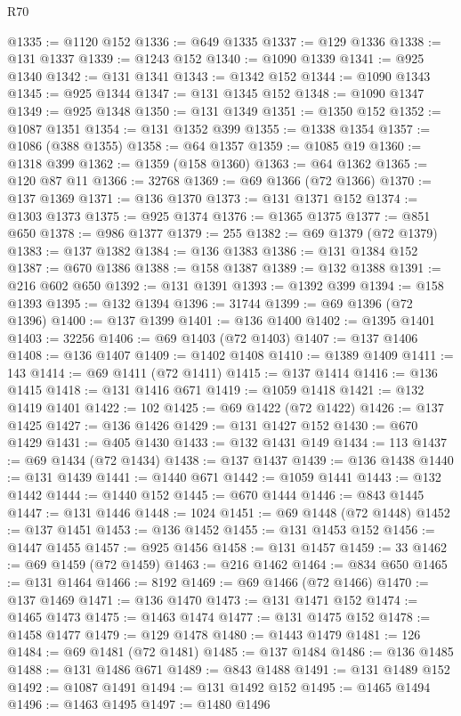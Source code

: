 \begin{lexlean}{R70}
\begin{coremodule}
@1335 := @1120 @152
@1336 := @649 @1335
@1337 := @129 @1336
@1338 := @131 @1337
@1339 := @1243 @152
@1340 := @1090 @1339
@1341 := @925 @1340
@1342 := @131 @1341
@1343 := @1342 @152
@1344 := @1090 @1343
@1345 := @925 @1344
@1347 := @131 @1345 @152
@1348 := @1090 @1347
@1349 := @925 @1348
@1350 := @131 @1349
@1351 := @1350 @152
@1352 := @1087 @1351
@1354 := @131 @1352 @399
@1355 := @1338 @1354
@1357 := @1086 (@388 @1355)
@1358 := @64 @1357
@1359 := @1085 @19
@1360 := @1318 @399
@1362 := @1359 (@158 @1360)
@1363 := @64 @1362
@1365 := @120 @87 @11
@1366 := 32768
@1369 := @69 @1366 (@72 @1366)
@1370 := @137 @1369
@1371 := @136 @1370
@1373 := @131 @1371 @152
@1374 := @1303 @1373
@1375 := @925 @1374
@1376 := @1365 @1375
@1377 := @851 @650
@1378 := @986 @1377
@1379 := 255
@1382 := @69 @1379 (@72 @1379)
@1383 := @137 @1382
@1384 := @136 @1383
@1386 := @131 @1384 @152
@1387 := @670 @1386
@1388 := @158 @1387
@1389 := @132 @1388
@1391 := @216 @602 @650
@1392 := @131 @1391
@1393 := @1392 @399
@1394 := @158 @1393
@1395 := @132 @1394
@1396 := 31744
@1399 := @69 @1396 (@72 @1396)
@1400 := @137 @1399
@1401 := @136 @1400
@1402 := @1395 @1401
@1403 := 32256
@1406 := @69 @1403 (@72 @1403)
@1407 := @137 @1406
@1408 := @136 @1407
@1409 := @1402 @1408
@1410 := @1389 @1409
@1411 := 143
@1414 := @69 @1411 (@72 @1411)
@1415 := @137 @1414
@1416 := @136 @1415
@1418 := @131 @1416 @671
@1419 := @1059 @1418
@1421 := @132 @1419 @1401
@1422 := 102
@1425 := @69 @1422 (@72 @1422)
@1426 := @137 @1425
@1427 := @136 @1426
@1429 := @131 @1427 @152
@1430 := @670 @1429
@1431 := @405 @1430
@1433 := @132 @1431 @149
@1434 := 113
@1437 := @69 @1434 (@72 @1434)
@1438 := @137 @1437
@1439 := @136 @1438
@1440 := @131 @1439
@1441 := @1440 @671
@1442 := @1059 @1441
@1443 := @132 @1442
@1444 := @1440 @152
@1445 := @670 @1444
@1446 := @843 @1445
@1447 := @131 @1446
@1448 := 1024
@1451 := @69 @1448 (@72 @1448)
@1452 := @137 @1451
@1453 := @136 @1452
@1455 := @131 @1453 @152
@1456 := @1447 @1455
@1457 := @925 @1456
@1458 := @131 @1457
@1459 := 33
@1462 := @69 @1459 (@72 @1459)
@1463 := @216 @1462
@1464 := @834 @650
@1465 := @131 @1464
@1466 := 8192
@1469 := @69 @1466 (@72 @1466)
@1470 := @137 @1469
@1471 := @136 @1470
@1473 := @131 @1471 @152
@1474 := @1465 @1473
@1475 := @1463 @1474
@1477 := @131 @1475 @152
@1478 := @1458 @1477
@1479 := @129 @1478
@1480 := @1443 @1479
@1481 := 126
@1484 := @69 @1481 (@72 @1481)
@1485 := @137 @1484
@1486 := @136 @1485
@1488 := @131 @1486 @671
@1489 := @843 @1488
@1491 := @131 @1489 @152
@1492 := @1087 @1491
@1494 := @131 @1492 @152
@1495 := @1465 @1494
@1496 := @1463 @1495
@1497 := @1480 @1496

\end{coremodule}
\end{lexlean}
